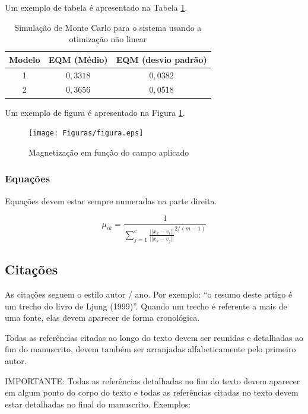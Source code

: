 \documentclass[conference,harvard,brazil,english]{icttcc}
\begin{document}
Um exemplo de tabela é apresentado na Tabela \ref{tab_tabela_1}.

\begin{table}[H]
	\caption{Simulação de Monte Carlo para o sistema usando a otimização não linear}
	{	
		\begin{tabular}	{|c|c|c|}
			\hline	
			Modelo & EQM (Médio) & EQM (desvio padrão)  \\ 
			\hline
			1 & $0,3318$ & $0,0382$  \\ \hline
			2 & $0,3656$ & $0,0518$  \\
			\hline
		\end{tabular}
	}
	\label{tab_tabela_1}
\end{table}

Um exemplo de figura é apresentado na Figura \ref{fig:fig_1}.

\begin{figure}[H]
	\centering
	\texttt{[image: Figuras/figura.eps]}
	\caption{Magnetização em função do campo aplicado}
	\label{fig:fig_1}
\end{figure}



\subsubsection {Equações}
Equações devem estar sempre numeradas na parte direita.

\begin{equation} \label{cmeans_pert}
\mu_{ik}=\frac{1}{\sum\limits_{j=1}^{c}{\frac{||x_k-v_i||}{||x_k-v_j||}}^{2/(m-1)}}
\end{equation}

\subsection{Citações}

As citações seguem o estilo autor / ano. Por exemplo: ``o resumo deste artigo é um trecho do livro de Ljung (1999)''. Quando um trecho é referente a mais de uma fonte, elas devem aparecer de forma cronológica.

Todas as referências citadas ao longo do texto devem ser reunidas e detalhadas ao fim do manuscrito, devem também ser arranjadas alfabeticamente pelo primeiro autor.

IMPORTANTE: Todas as referências detalhadas no fim do texto devem aparecer em algum ponto do corpo do texto e todas as referências citadas no texto devem estar detalhadas no final do manuscrito.
Exemplos:
\end{document}
